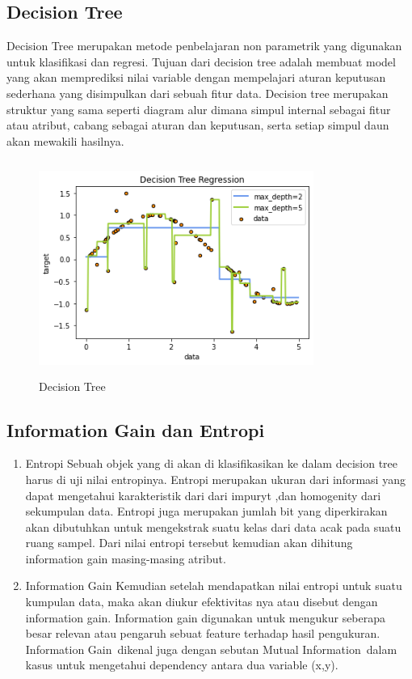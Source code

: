	\subsection{Decision Tree}
	Decision Tree merupakan metode penbelajaran non parametrik yang digunakan untuk klasifikasi dan regresi. Tujuan dari decision tree adalah membuat model yang akan memprediksi nilai variable dengan mempelajari aturan keputusan sederhana yang disimpulkan dari sebuah fitur data. Decision tree merupakan struktur yang sama seperti diagram alur dimana simpul internal sebagai fitur atau atribut, cabang sebagai aturan dan keputusan, serta setiap simpul daun akan mewakili hasilnya.
	\begin{figure}[!htbp]
		\centering
		\includegraphics[width=9cm,height=7cm]{figures/decision_tree_regresi.png}
		\caption{Decision Tree}
		\label{penanda}
	\end{figure}

	\subsection{Information Gain dan Entropi}
	\begin{enumerate}
	\item Entropi
	\newline Sebuah objek yang di akan di klasifikasikan ke dalam decision tree harus di uji nilai entropinya. Entropi merupakan ukuran dari informasi yang dapat mengetahui karakteristik  dari dari impuryt ,dan homogenity dari sekumpulan data. Entropi juga merupakan jumlah bit yang diperkirakan akan dibutuhkan untuk mengekstrak suatu kelas dari data acak pada suatu ruang sampel. Dari nilai entropi tersebut kemudian akan dihitung information gain masing-masing atribut. 

	\item Information Gain
	\newline Kemudian setelah mendapatkan nilai entropi untuk suatu kumpulan data, maka akan diukur efektivitas nya atau disebut dengan information gain. Information gain digunakan untuk mengukur seberapa besar relevan atau pengaruh sebuat feature terhadap hasil pengukuran. Information Gain dikenal juga dengan sebutan Mutual Information dalam kasus untuk mengetahui dependency antara dua variable (x,y).
	\end{enumerate}


